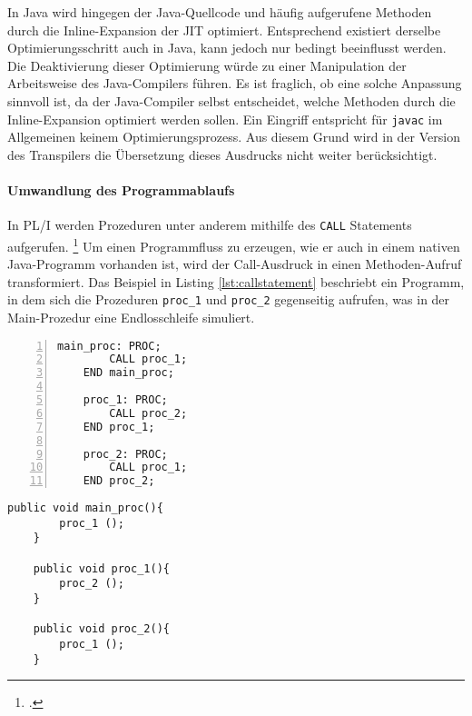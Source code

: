 In Java wird hingegen der Java-Quellcode und häufig aufgerufene Methoden durch die Inline-Expansion der \ac{JIT} optimiert. Entsprechend existiert derselbe Optimierungsschritt auch in Java, kann jedoch nur bedingt beeinflusst werden. Die Deaktivierung dieser Optimierung würde zu einer Manipulation der Arbeitsweise des Java-Compilers führen. Es ist fraglich, ob eine solche Anpassung sinnvoll ist, da der Java-Compiler selbst entscheidet, welche Methoden durch die Inline-Expansion optimiert werden sollen. Ein Eingriff entspricht für \verb+javac+ im Allgemeinen keinem Optimierungsprozess.
Aus diesem Grund wird in der Version des Transpilers die Übersetzung dieses Ausdrucks nicht weiter berücksichtigt.


\pagebreak
\paragraph{Umwandlung des Programmablaufs}

In PL/I werden Prozeduren unter anderem mithilfe des \verb+CALL+ Statements aufgerufen. \footcite[Vgl. ][S.133ff. ]{pliref} Um einen Programmfluss zu erzeugen, wie er auch in einem nativen Java-Programm vorhanden ist, wird der Call-Ausdruck in einen Methoden-Aufruf transformiert. 
Das Beispiel in Listing \ref{lst:callstatement} beschriebt ein Programm, in dem sich die Prozeduren \verb+proc_1+ und \verb+proc_2+ gegenseitig aufrufen, was in der Main-Prozedur eine Endlosschleife simuliert.

\begin{minipage}[b]{0.48\linewidth}
	\centering
	\lstset{language=PL/I,label=SliceExaple}
	\begin{lstlisting}[frame=single, numbers=left, mathescape,%
		caption={Prozeduraufruf}, label={lst:callstatement},
		basicstyle=\fontsize{9}{13}\selectfont\ttfamily]
	main_proc: PROC;
		CALL proc_1;
	END main_proc;
		
	proc_1: PROC;
		CALL proc_2;
	END proc_1;
		
	proc_2: PROC;
		CALL proc_1;
	END proc_2;
	\end{lstlisting}
\end{minipage}
\hspace{0.5cm}
\begin{minipage}[b]{0.48\linewidth}
	\centering
	\lstset{language=Java,label=SliceExaple}
	\begin{lstlisting}[frame=single, mathescape,%
		title={" "},
		basicstyle=\fontsize{9}{13}\selectfont\ttfamily]
	public void main_proc(){
		proc_1 ();
	}
		
	public void proc_1(){
		proc_2 ();
	}
		
	public void proc_2(){
		proc_1 ();
	}
	\end{lstlisting}
\end{minipage}


